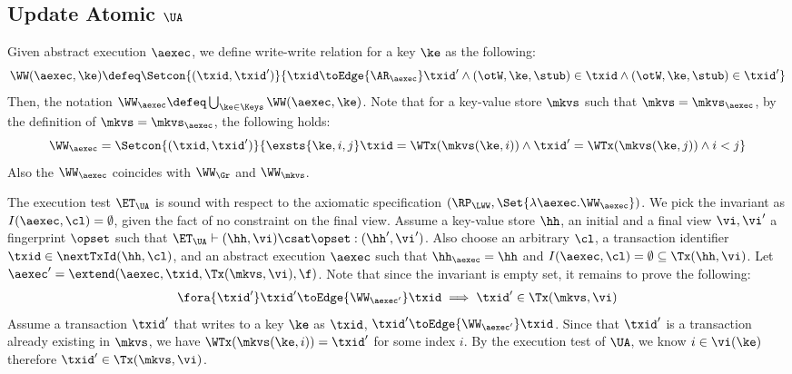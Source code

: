 \subsection{Update Atomic \( \UA \)}
\label{sec:sound-complete-ua}

Given abstract execution \( \aexec \), we define write-write relation for a key \( \ke \) as the following:
\[ 
    \WW(\aexec,\ke) \defeq \Setcon{(\txid, \txid')}{\txid \toEdge{\AR_\aexec} \txid' \land (\otW,\ke, \stub ) \in \txid \land (\otW,\ke, \stub ) \in \txid'  } 
\]
Then, the notation \( \WW_\aexec \defeq \bigcup_{\ke \in \Keys} \WW(\aexec, \ke) \).
Note that for a key-value store \( \mkvs \) such that \( \mkvs = \mkvs_\aexec \),
by the definition of  \(  \mkvs = \mkvs_\aexec \), 
the following holds:
\[
    \WW_\aexec = \Setcon{(\txid, \txid')}{\exsts{\ke, i,j } \txid = \WTx(\mkvs(\ke, i)) \land \txid' = \WTx(\mkvs(\ke, j)) \land i < j}
\]
Also the \( \WW_\aexec \) coincides with \( \WW_\Gr \) and \( \WW_\mkvs \).

The execution test $\ET_\UA$ is sound with respect to the axiomatic specification \( (\RP_{\LWW}, \Set{\lambda \aexec. \WW_\aexec }) \).
We pick the invariant as \( I( \aexec, \cl ) = \emptyset \), given the fact of no constraint on the final view.
Assume a key-value store $\hh$, an initial and a final view $\vi, \vi'$  a fingerprint $\opset$ 
such that $\ET_{\UA} \vdash (\hh, \vi) \csat \opset: (\hh', \vi')$. 
Also choose an arbitrary $\cl$, a transaction identifier $\txid \in \nextTxId(\hh, \cl)$, 
and an abstract execution $\aexec$ such that $\hh_{\aexec} = \hh$ and 
\( I(\aexec, \cl) =  \emptyset \subseteq \Tx(\hh, \vi) \).
Let \( \aexec' = \extend(\aexec, \txid, \Tx(\mkvs, \vi), \f ) \).
Note that since the invariant is empty set, it remains to prove the following:
\[
    \begin{array}{@{}l@{}}
        \fora{ \txid' } \txid' \toEdge{\WW_{\aexec'}} \txid \implies \txid' \in \Tx(\mkvs, \vi)
    \end{array}
\]
Assume a transaction \( \txid' \) that writes to a key \( \ke \) as \( \txid \), \ie \( \txid' \toEdge{\WW_{\aexec'}} \txid \).
Since that \( \txid' \) is a transaction already existing in \( \mkvs\),
we have \( \WTx(\mkvs(\ke, i)) = \txid' \) for some index \( i \).
By the execution test of \( \UA \), we know \( i \in \vi(\ke) \) therefore \( \txid' \in \Tx(\mkvs, \vi) \).

